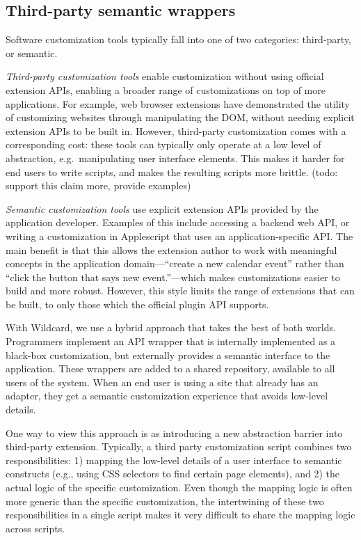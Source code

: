 \documentclass[sigplan,10pt,anonymous,review]{acmart}
\begin{document}
\hypertarget{third-party-semantic-wrappers}{%
\subsection{Third-party semantic
wrappers}\label{third-party-semantic-wrappers}}

Software customization tools typically fall into one of two categories:
third-party, or semantic.

\emph{Third-party customization tools} enable customization without
using official extension APIs, enabling a broader range of
customizations on top of more applications. For example, web browser
extensions have demonstrated the utility of customizing websites through
manipulating the DOM, without needing explicit extension APIs to be
built in. However, third-party customization comes with a corresponding
cost: these tools can typically only operate at a low level of
abstraction, e.g.~manipulating user interface elements. This makes it
harder for end users to write scripts, and makes the resulting scripts
more brittle. (todo: support this claim more, provide examples)

\emph{Semantic customization tools} use explicit extension APIs provided
by the application developer. Examples of this include accessing a
backend web API, or writing a customization in Applescript that uses an
application-specific API. The main benefit is that this allows the
extension author to work with meaningful concepts in the application
domain---``create a new calendar event'' rather than ``click the button
that says new event.''---which makes customizations easier to build and
more robust. However, this style limits the range of extensions that can
be built, to only those which the official plugin API supports.

With Wildcard, we use a hybrid approach that takes the best of both
worlds. Programmers implement an API wrapper that is internally
implemented as a black-box customization, but externally provides a
semantic interface to the application. These wrappers are added to a
shared repository, available to all users of the system. When an end
user is using a site that already has an adapter, they get a semantic
customization experience that avoids low-level details.

One way to view this approach is as introducing a new abstraction
barrier into third-party extension. Typically, a third party
customization script combines two responsibilities: 1) mapping the
low-level details of a user interface to semantic constructs (e.g.,
using CSS selectors to find certain page elements), and 2) the actual
logic of the specific customization. Even though the mapping logic is
often more generic than the specific customization, the intertwining of
these two responsibilities in a single script makes it very difficult to
share the mapping logic across scripts.
\end{document}
